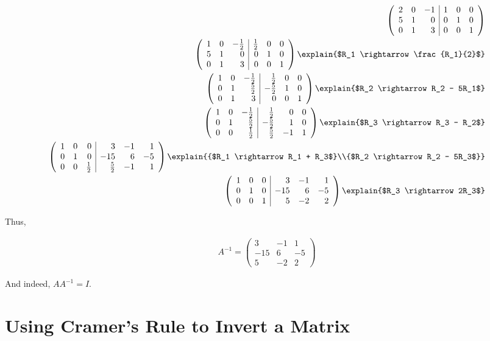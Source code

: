 \begin{align*}
  \left(
    \begin{array}{rrr|rrr}  %
      2 & 0 & -1 & 1 & 0 & 0\\
      5 & 1 &  0 & 0 & 1 & 0\\
      0 & 1 &  3 & 0 & 0 & 1
    \end{array}
  \right)\\
  \left(
    \begin{array}{rrr|rrr}
      1 & 0 & - \frac{1}{2} & \frac{1}{2} & 0 & 0\\
      5 & 1 &             0 &           0 & 1 & 0\\
      0 & 1 &             3 &           0 & 0 & 1
    \end{array}
  \right)
  \explain{$R_1 \rightarrow \frac{R_1}{2}$}\\
  \left(
    \begin{array}{rrr|rrr}
      1 & 0 & - \frac{1}{2} &  \frac{1}{2} & 0 & 0\\
      0 & 1 &   \frac{5}{2} & -\frac{5}{2} & 1 & 0\\
      0 & 1 &             3 &            0 & 0 & 1
    \end{array}
  \right)
  \explain{$R_2 \rightarrow R_2 - 5R_1$}\\
  \left(
    \begin{array}{rrr|rrr}
      1 & 0 & - \frac{1}{2} &  \frac{1}{2} &  0 & 0\\
      0 & 1 &   \frac{5}{2} & -\frac{5}{2} &  1 & 0\\
      0 & 0 &   \frac{1}{2} &  \frac{5}{2} & -1 & 1
    \end{array}
  \right)
  \explain{$R_3 \rightarrow R_3 - R_2$}\\
  \left(
    \begin{array}{rrr|rrr}
      1 & 0 &             0 &            3 & -1 &  1\\
      0 & 1 &             0 &          -15 &  6 & -5\\
      0 & 0 &   \frac{1}{2} &  \frac{5}{2} & -1 &  1
    \end{array}
  \right)
  \explain{{$R_1 \rightarrow R_1 + R_3$}\\{$R_2 \rightarrow R_2 - 5R_3$}}\\
  \left(
    \begin{array}{rrr|rrr}
      1 & 0 & 0 &   3 & -1 &  1\\
      0 & 1 & 0 & -15 &  6 & -5\\
      0 & 0 & 1 &   5 & -2 &  2
    \end{array}
  \right)
  \explain{$R_3 \rightarrow 2R_3$}
\end{align*}

Thus,

\begin{align*}
  A^{-1} =
  \begin{pmatrix}
    3 & -1 & 1\\
    -15 & 6 & -5\\
    5 & -2 & 2
  \end{pmatrix}
\end{align*}

And indeed, $AA^{-1} = I$.

\section{Using Cramer's Rule to Invert a Matrix}


